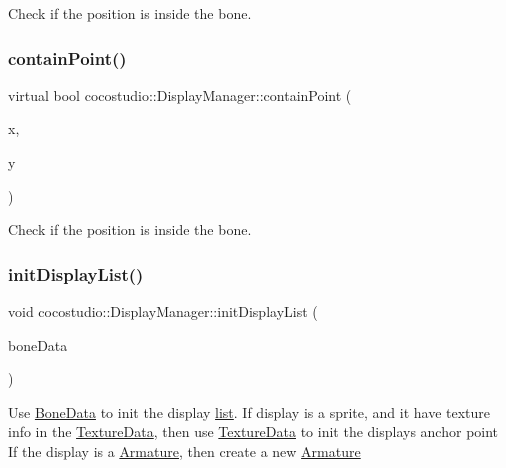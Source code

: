 Check if the position is inside the bone. \mbox{\label{classcocostudio_1_1DisplayManager_a3606e657c355e28e72546e9b4a6c6ced}} 
\subsubsection{\texorpdfstring{contain\+Point()}{containPoint()}\hspace{0.1cm}{\footnotesize\ttfamily [4/4]}}
{\footnotesize\ttfamily virtual bool cocostudio\+::\+Display\+Manager\+::contain\+Point (\begin{DoxyParamCaption}\item[{float}]{x,  }\item[{float}]{y }\end{DoxyParamCaption})\hspace{0.3cm}{\ttfamily [virtual]}}

Check if the position is inside the bone. \mbox{\label{classcocostudio_1_1DisplayManager_a52d5c8095ef494190837cd9f7a3600ae}} 
\subsubsection{\texorpdfstring{init\+Display\+List()}{initDisplayList()}\hspace{0.1cm}{\footnotesize\ttfamily [1/2]}}
{\footnotesize\ttfamily void cocostudio\+::\+Display\+Manager\+::init\+Display\+List (\begin{DoxyParamCaption}\item[{\hyperlink{classcocostudio_1_1BoneData}{Bone\+Data} $\ast$}]{bone\+Data }\end{DoxyParamCaption})\hspace{0.3cm}{\ttfamily [virtual]}}

Use \hyperlink{classcocostudio_1_1BoneData}{Bone\+Data} to init the display \hyperlink{protocollist-p}{list}. If display is a sprite, and it have texture info in the \hyperlink{classcocostudio_1_1TextureData}{Texture\+Data}, then use \hyperlink{classcocostudio_1_1TextureData}{Texture\+Data} to init the display\textquotesingle{}s anchor point If the display is a \hyperlink{classcocostudio_1_1Armature}{Armature}, then create a new \hyperlink{classcocostudio_1_1Armature}{Armature} \mbox{\label{classcocostudio_1_1DisplayManager_a5c87cebae7ca6e84ad6656cb4ba2d555}} 
